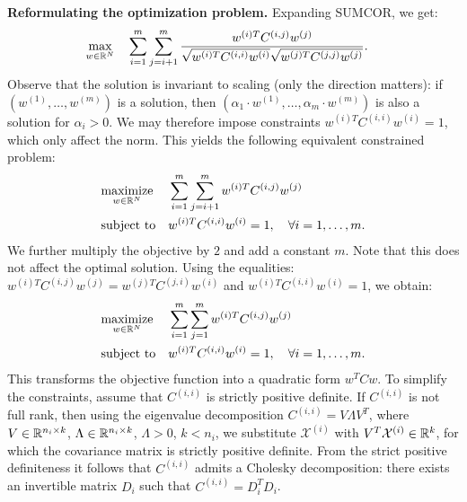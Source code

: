 \noindent\textbf{Reformulating the optimization problem.} Expanding SUMCOR,
we get:
\begin{equation*}
\begin{aligned}
& \underset{w \in \mathbb{R}^N}{\text{max}} & & \sum_{i = 1}^m
  \sum_{j = i+1}^m \frac{w^{(i)T} C^{(i,j)}
    w^{(j)}}{\sqrt{w^{(i)T} C^{(i,i)} w^{(i)}} \sqrt{w^{(j)T}
      C^{(j,j)} w^{(j)}}}.
\end{aligned}
\end{equation*}
%
%
Observe that the solution is invariant to scaling (only the direction matters): if $\left(w^{(1)}, \ldots, w^{(m)}\right)$ is a solution, then $\left(\alpha_1 \cdot w^{(1)}, \ldots, \alpha_m \cdot w^{(m)}\right)$ is also a solution for $\alpha_i > 0$. We may therefore impose constraints $w^{(i)T}C^{(i,i)}w^{(i)} = 1$, which only affect the norm. This yields the following
 equivalent constrained problem:
\begin{equation}\label{eq:qcqp0}
\begin{aligned}
& \underset{w \in \mathbb{R}^N}{\text{maximize}}
& & \sum_{i = 1}^m \sum_{j = i+1}^m w^{(i)T} C^{(i,j)} w^{(j)}\\
& \text{subject to}
& &w^{(i)T} C^{(i,i)} w^{(i)} = 1, \quad\forall i = 1,\ldots, m.
\end{aligned}
\end{equation}
%
We further multiply the objective by $2$ and add a constant $m$. Note that this does not
affect the optimal solution. Using the equalities: $w^{(i)T} C^{(i,j)} w^{(j)} = w^{(j)T} C^{(j,i)} w^{(i)}$ and $w^{(i)T} C^{(i,i)} w^{(i)} = 1$, we obtain:
%
%
\begin{equation}\label{eq:qcqp05}
\begin{aligned}
& \underset{w \in \mathbb{R}^N}{\text{maximize}}
& & \sum_{i = 1}^m \sum_{j = 1}^m w^{(i)T} C^{(i,j)} w^{(j)}\\
& \text{subject to}
& &w^{(i)T} C^{(i,i)} w^{(i)} = 1, \quad\forall i = 1,\ldots, m.
\end{aligned}
\end{equation}
This transforms the objective function into a quadratic form $w^T C w$. To
simplify the constraints, assume that $C^{(i,i)}$ is strictly positive definite. If $C^{(i,i)}$ is not full rank, then using the eigenvalue decomposition $C^{(i,i)} = V \Lambda V^T$, where $V \in \mathbb{R}^{n_i \times k}$, $\Lambda \in \mathbb{R}^{n_i \times k}$, $\Lambda > 0$, $k < n_i$, we substitute $\mathcal{X}^{(i)}$ with $V^T \mathcal{X}^{(i)} \in \mathbb{R}^k$, for which the covariance matrix is strictly positive definite.
%
%
From the strict positive definiteness it follows that $C^{(i,i)}$ admits a Cholesky decomposition: there exists an invertible matrix $D_i$ such that $C^{(i,i)} = D_i^T D_i$.

